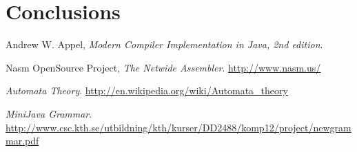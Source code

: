\documentclass[11pt]{amsart}
\begin{document}
\section{Conclusions}

\begin{thebibliography}{9}

	Andrew W. Appel,
	\emph{Modern Compiler Implementation in Java, 2nd edition}.


	Nasm OpenSource Project,
	\emph{The Netwide Assembler}.
	\url{http://www.nasm.us/}

	\emph{Automata Theory}.
	\url{http://en.wikipedia.org/wiki/Automata_theory}

	\emph{MiniJava Grammar}.
	\url{http://www.csc.kth.se/utbildning/kth/kurser/DD2488/komp12/project/newgrammar.pdf}

\end{thebibliography}
\end{document}
